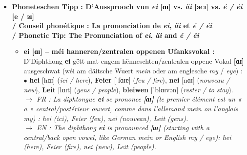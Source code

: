 \begin{itemize}
    \item \textbf{Phoneteschen Tipp : D'Aussprooch vun \textit{ei} {[ɑɪ]} vs. \textit{äi} {[æːɪ]} vs. \textit{é / éi} {[e / ɜɪ]} \\
    / Conseil phonétique : La prononciation de \textit{ei}, \textit{äi} et \textit{é / éi} \\
    / Phonetic Tip: The Pronunciation of \textit{ei}, \textit{äi} and \textit{é / éi}}
    \begin{itemize}
        \item \textbf{ei {[ɑɪ]} -- méi hanneren/zentralen oppenen Ufanksvokal :} \\
        D'Diphthong \textbf{ei} gëtt mat engem hënneschten/zentralen oppene Vokal \textbf{{[ɑɪ]}} ausgeschwat (wéi am däitsche Wuert \textit{mein} oder am englesche \textit{my} / \textit{eye}) : \\
        $\bullet$ \textbf{hei} {[hɑɪ]} (\textit{ici / here}), \textbf{Feier} {[ˈfɑɪɐ]} (\textit{feu / fire}), \textbf{nei} {[nɑɪ]} (\textit{nouveau / new}), \textbf{Leit} {[lɑɪt]} (\textit{gens / people}), \textbf{bleiwen} {[ˈblɑɪvən]} (\textit{rester / to stay}). \\
        $\rightarrow$ \textit{FR : La diphtongue \textbf{ei} se prononce \textbf{[ɑɪ]} (le premier élément est un « a » central/postérieur ouvert, comme dans l'allemand \textit{mein} ou l'anglais \textit{my}) : \textit{hei} (ici), \textit{Feier} (feu), \textit{nei} (nouveau), \textit{Leit} (gens).} \\
        $\rightarrow$ \textit{EN : The diphthong \textbf{ei} is pronounced \textbf{[ɑɪ]} (starting with a central/back open vowel, like German \textit{mein} or English \textit{my} / \textit{eye}): \textit{hei} (here), \textit{Feier} (fire), \textit{nei} (new), \textit{Leit} (people).}

        \vspace{0.3em}


\end{itemize}
\end{itemize}

